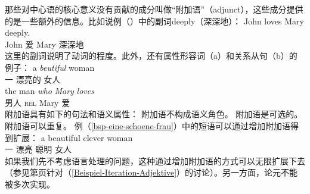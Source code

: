 那些对中心语的核心意义没有贡献的成分叫做“附加语”（adjunct），这些成分提供的是一些额外的信息。比如说例（）中的副词deeply（深深地）：
\ea
\gll John loves Mary deeply. \\
     John 爱 Mary 深深地 \\
\z
这里的副词说明了动词的程度。此外，还有属性形容词（a）和关系从句（b）的例子：
\eal
\ex\label{bsp-eine-schoene-frau}
\gll a {\em beutiful\/} woman\\
一 漂亮的 女人\\
\ex 
\gll the man {\em who\/} {\em Mary\/} {\em loves\/}\\
        男人 \textsc{rel} Mary  爱\\
\zl
附加语具有如下的句法和语义属性：
\eal
\label{adj-kriterien}
\ex 附加语不构成语义角色。
\ex 附加语是可选的。
\ex 附加语可以重复。
\zl
例（\ref{bsp-eine-schoene-frau}）中的短语可以通过增加附加语得到扩展：
\ea
\gll a beautiful clever woman \\
     一 漂亮 聪明 女人 \\
\z
如果我们先不考虑语言处理的问题，这种通过增加附加语的方式可以无限扩展下去（参见第\pageref{Beispiel-Iteration-Adjektive}页针对（\ref{Beispiel-Iteration-Adjektive}）的讨论）。另一方面，论元不能被多次实现。
\z


